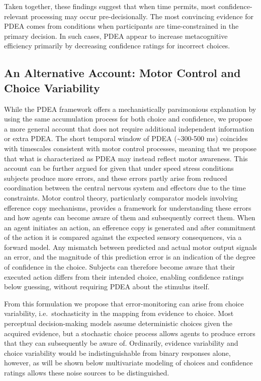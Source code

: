 \documentclass[
]{article}
\begin{document}
Taken together, these findings suggest that when time permits, most
confidence-relevant processing may occur pre-decisionally. The most
convincing evidence for PDEA comes from conditions when participants are
time-constrained in the primary decision. In such cases, PDEA appear to
increase metacognitive efficiency primarily by decreasing confidence
ratings for incorrect choices.

\subsection{An Alternative Account: Motor Control and Choice
Variability}\label{an-alternative-account-motor-control-and-choice-variability}

While the PDEA framework offers a mechanistically parsimonious
explanation by using the same accumulation process for both choice and
confidence, we propose a more general account that does not require
additional independent information or extra PDEA. The short temporal
window of PDEA (\textasciitilde300-500 ms) coincides with timescales
consistent with motor control processes, meaning that we propose that
what is characterized as PDEA may instead reflect motor awareness. This
account can be further argued for given that under speed stress
conditions subjects produce more errors, and these errors partly arise
from reduced coordination between the central nervous system and
effectors due to the time constraints. Motor control theory,
particularly comparator models involving efference copy mechanisms,
provides a framework for understanding these errors and how agents can
become aware of them and subsequently correct them. When an agent
initiates an action, an efference copy is generated and after commitment
of the action it is compared against the expected sensory consequences,
via a forward model. Any mismatch between predicted and actual motor
output signals an error, and the magnitude of this prediction error is
an indication of the degree of confidence in the choice. Subjects can
therefore become aware that their executed action differs from their
intended choice, enabling confidence ratings below guessing, without
requiring PDEA about the stimulus itself.

From this formulation we propose that error-monitoring can arise from
choice variability, i.e.~stochasticity in the mapping from evidence to
choice. Most perceptual decision-making models assume deterministic
choices given the acquired evidence, but a stochastic choice process
allows agents to produce errors that they can subsequently be aware of.
Ordinarily, evidence variability and choice variability would be
indistinguishable from binary responses alone, however, as will be shown
below multivariate modeling of choices and confidence ratings allows
these noise sources to be distinguished.
\end{document}

